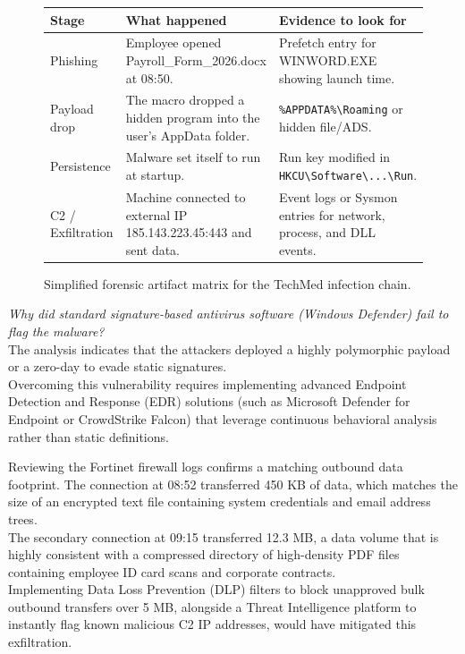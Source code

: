 \begin{figure}[H]
    \centering
    \small
    \begin{tabularx}{\textwidth}{|p{3cm}|X|X|}
    \hline
    \textbf{Stage} & \textbf{What happened} & \textbf{Evidence to look for} \\ \hline
    Phishing & Employee opened Payroll\_Form\_2026.docx at 08:50. & Prefetch entry for WINWORD.EXE showing launch time. \\ \hline
    Payload drop & The macro dropped a hidden program into the user's AppData folder. & \texttt{\%APPDATA\%\textbackslash Roaming} or hidden file/ADS. \\ \hline
    Persistence & Malware set itself to run at startup. & Run key modified in \texttt{HKCU\textbackslash Software\textbackslash...\textbackslash Run}. \\ \hline
    C2 / Exfiltration & Machine connected to external IP 185.143.223.45:443 and sent data. & Event logs or Sysmon entries for network, process, and DLL events. \\ \hline
    \end{tabularx}
    \caption{Simplified forensic artifact matrix for the TechMed infection chain.}
\end{figure}

\noindent
\textit{Why  did standard signature-based antivirus software (Windows Defender) fail to flag the malware?}\\
The analysis indicates that the attackers deployed a highly polymorphic payload or a zero-day to evade static signatures. \\
Overcoming this vulnerability requires implementing advanced Endpoint Detection and Response (EDR) solutions (such as Microsoft Defender for Endpoint or CrowdStrike Falcon) that leverage continuous behavioral analysis rather than static definitions.
\medskip

\noindent
Reviewing the Fortinet firewall logs confirms a matching outbound data footprint. The connection at 08:52 transferred 450 KB of data, which matches the size of an encrypted text file containing system credentials and email address trees.\\ The secondary connection at 09:15 transferred 12.3 MB, a data volume that is highly consistent with a compressed directory of high-density PDF files containing employee ID card scans and corporate contracts. \\
Implementing Data Loss Prevention (DLP) filters to block unapproved bulk outbound transfers over 5 MB, alongside a Threat Intelligence platform to instantly flag known malicious C2 IP addresses, would have mitigated this exfiltration.



